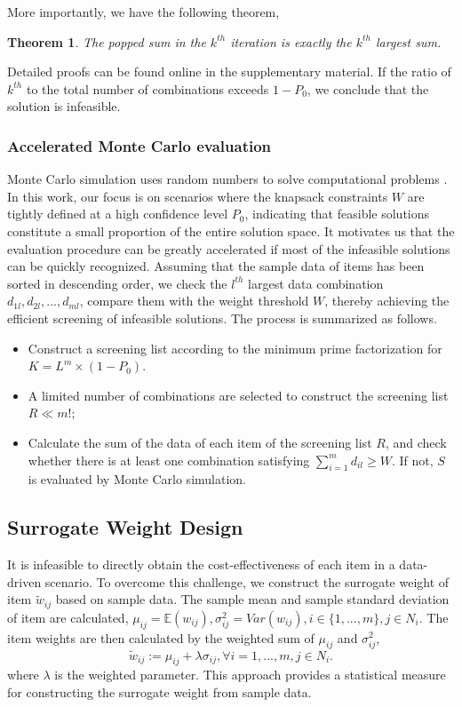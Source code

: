 \documentclass[lettersize,journal]{IEEEtran}
\newtheorem{theorem}{Theorem}[section]
\begin{document}
More importantly, we have the following theorem,
\begin{theorem}
The popped sum in the $k^{th}$ iteration is exactly the $k^{th}$ largest sum.
\end{theorem}

Detailed proofs can be found online in the supplementary material. 
If the ratio of $k^{th}$ to the total number of combinations exceeds $1-P_0$, we conclude that the solution is infeasible.

\subsubsection{Accelerated Monte Carlo evaluation}
Monte Carlo simulation uses random numbers to solve computational problems \cite{metropolis1949monte,LiuTL020}.
In this work, our focus is on scenarios where the knapsack constraints $W$ are tightly defined at a high confidence level $P_0$, indicating that feasible solutions constitute a small proportion of the entire solution space.
It motivates us that the evaluation procedure can be greatly accelerated if most of the infeasible solutions can be quickly recognized. 
Assuming that the sample data of items has been sorted in descending order, we check the $l^{th}$ largest data combination $d_{1l}, d_{2l},...,d_{ml}$, compare them with the weight threshold $W$, thereby achieving the efficient screening of infeasible solutions.
The process is summarized as follows.
\begin{itemize}
    \item Construct a screening list according to the minimum prime factorization for $K=L^m\times (1-P_0)$.
    \item A limited number of combinations are selected to construct the screening list $R\ll m!$;
    \item Calculate the sum of the data of each item of the screening list $R$, and check whether there is at least one combination satisfying $\sum_{i=1}^{m}d_{il} \geq W$. If not, $S$ is evaluated by Monte Carlo simulation.
\end{itemize}

\subsection{Surrogate Weight Design}
It is infeasible to directly obtain the cost-effectiveness of each item in a data-driven scenario. 
To overcome this challenge, we construct the surrogate weight of item $\tilde{w}_{ij}$ based on sample data. 
The sample mean and sample standard deviation of item are calculated, $\mu_{ij}=\mathbb{E}(w_{ij}),\sigma^2_{ij}=Var(w_{ij}),i\in \{1,...,m\}, j \in N_i$. 
The item weights are then calculated by the weighted sum of $\mu_{ij}$ and $\sigma^2_{ij}$,
\begin{equation}\label{Definition: surrogate weights}
    \tilde{w}_{ij}:=\mu_{ij}+\lambda\sigma _{ij}, \forall{i}=1,...,m, j\in N_i.
\end{equation}
where $\lambda $ is the weighted parameter. 
This approach provides a statistical measure for constructing the surrogate weight from sample data.
\end{document}
